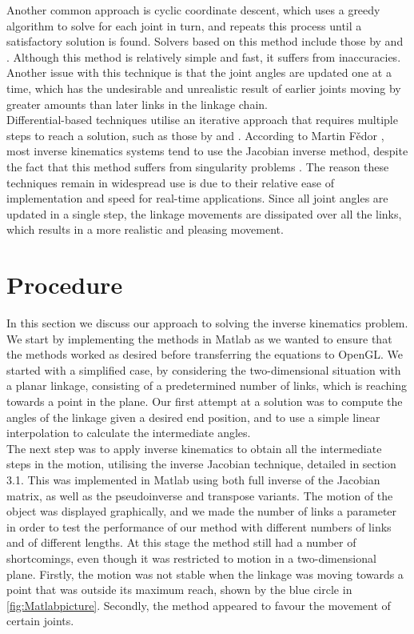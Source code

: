 \documentclass[paper=a4, fontsize=11pt]{scrartcl} %
\numberwithin{equation}{section} %
\numberwithin{figure}{section} %
\numberwithin{table}{section} %
\begin{document}
Another common approach is cyclic coordinate descent, which uses a greedy algorithm to solve for each joint in turn, and repeats this process until a satisfactory solution is found. Solvers based on this method include those by \cite{Eber01} and \cite{Wang91}. Although this method is relatively simple and fast, it suffers from inaccuracies. Another issue with this technique is that the joint angles are updated one at a time, which has the undesirable and unrealistic result of earlier joints moving by greater amounts than later links in the linkage chain. \\

Differential-based techniques utilise an iterative approach that requires multiple steps to reach a solution, such as those by \cite{Watt92} and \cite{Zhao94}. According to Martin F\v{e}dor  \cite{Fedor2003}, most inverse kinematics systems tend to use the Jacobian inverse method, despite the fact that this method suffers from singularity problems \cite{Bonding07}. The reason these techniques remain in widespread use is due to their relative ease of implementation and speed for real-time applications. Since all joint angles are updated in a single step, the linkage movements are dissipated over all the links, which results in a more realistic and pleasing movement. 




\section{Procedure}
In this section we discuss our approach to solving the inverse kinematics problem. We start by implementing the methods in Matlab as we wanted to ensure that the methods worked as desired before transferring the equations to OpenGL. We started with a simplified case, by considering the two-dimensional situation with a planar linkage, consisting of a predetermined number of links, which is reaching towards a point in the plane. Our first attempt at a solution was to compute the angles of the linkage given a desired end position, and to use a simple linear interpolation to calculate the intermediate angles. \\

The next step was to apply inverse kinematics to obtain all the intermediate steps in the motion, utilising the inverse Jacobian technique, detailed in section 3.1. This was implemented in Matlab using both full inverse of the Jacobian matrix, as well as the pseudoinverse and transpose variants. The motion of the object was displayed graphically, and we made the number of links a parameter in order to test the performance of our method with different numbers of links and of different lengths. At this stage the method still had a number of shortcomings, even though it was restricted to motion in a two-dimensional plane. Firstly, the motion was not stable when the linkage was moving towards a point that was outside its maximum reach, shown by the blue circle in \ref{fig:Matlabpicture}. Secondly, the method appeared to favour the movement of certain joints. \\
\end{document}
